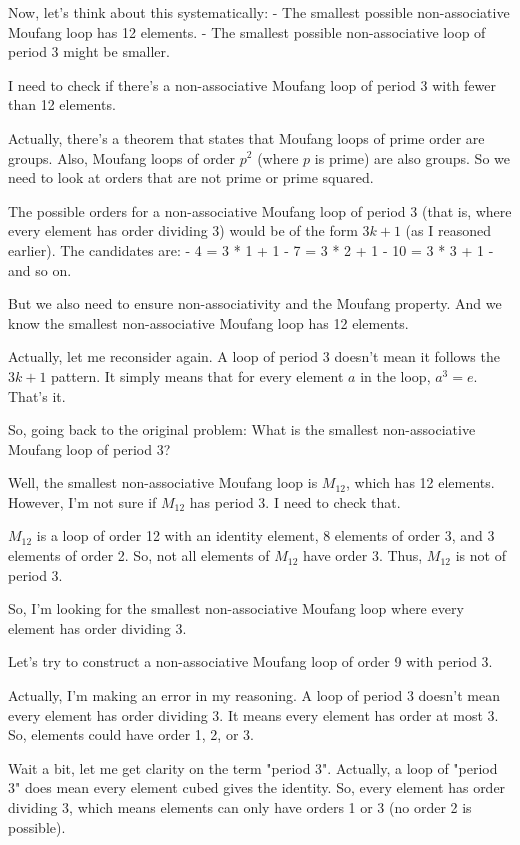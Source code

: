 \documentclass[12p]{article}
\newcounter{reasoningcounter}
\newenvironment{reasoning}[1][]
{\refstepcounter{reasoningcounter}%
\begin{tcolorbox}[
    title=Reasoning \thereasoningcounter: #1,
    colback=white, %
    colframe=gray,
    coltext=black, %
    fonttitle=\bfseries\normalsize,
    top=2mm,
    bottom=2mm,
    enlarge top initially by=5mm
]
\small
}
{\end{tcolorbox}}
\begin{document}
\begin{reasoning}
Now, let's think about this systematically:
- The smallest possible non-associative Moufang loop has 12 elements.
- The smallest possible non-associative loop of period 3 might be smaller.

I need to check if there's a non-associative Moufang loop of period 3 with fewer than 12 elements.

Actually, there's a theorem that states that Moufang loops of prime order are groups. Also, Moufang loops of order $p^2$ (where $p$ is prime) are also groups. So we need to look at orders that are not prime or prime squared.

The possible orders for a non-associative Moufang loop of period 3 (that is, where every element has order dividing 3) would be of the form $3k + 1$ (as I reasoned earlier). The candidates are:
- 4 = 3 * 1 + 1
- 7 = 3 * 2 + 1
- 10 = 3 * 3 + 1
- and so on.

But we also need to ensure non-associativity and the Moufang property. And we know the smallest non-associative Moufang loop has 12 elements.

Actually, let me reconsider again. A loop of period 3 doesn't mean it follows the $3k + 1$ pattern. It simply means that for every element $a$ in the loop, $a^3 = e$. That's it.

So, going back to the original problem: What is the smallest non-associative Moufang loop of period 3?

Well, the smallest non-associative Moufang loop is $M_{12}$, which has 12 elements. However, I'm not sure if $M_{12}$ has period 3. I need to check that.

$M_{12}$ is a loop of order 12 with an identity element, 8 elements of order 3, and 3 elements of order 2. So, not all elements of $M_{12}$ have order 3. Thus, $M_{12}$ is not of period 3.

So, I'm looking for the smallest non-associative Moufang loop where every element has order dividing 3.

Let's try to construct a non-associative Moufang loop of order 9 with period 3.

Actually, I'm making an error in my reasoning. A loop of period 3 doesn't mean every element has order dividing 3. It means every element has order at most 3. So, elements could have order 1, 2, or 3.

Wait a bit, let me get clarity on the term "period 3". Actually, a loop of "period 3" does mean every element cubed gives the identity. So, every element has order dividing 3, which means elements can only have orders 1 or 3 (no order 2 is possible).


\end{reasoning}
\end{document}
